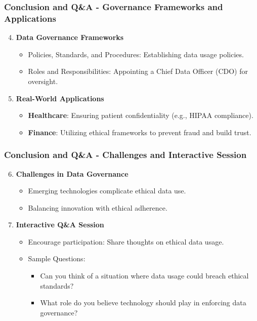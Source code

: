 \documentclass[aspectratio=169]{beamer}
\begin{document}
\begin{frame}[fragile]
    \frametitle{Conclusion and Q\&A - Governance Frameworks and Applications}
    \begin{enumerate}
        \setcounter{enumi}{3} %
        \item \textbf{Data Governance Frameworks}
            \begin{itemize}
                \item Policies, Standards, and Procedures: Establishing data usage policies.
                \item Roles and Responsibilities: Appointing a Chief Data Officer (CDO) for oversight.
            \end{itemize}
        
        \item \textbf{Real-World Applications}
            \begin{itemize}
                \item \textbf{Healthcare}: Ensuring patient confidentiality (e.g., HIPAA compliance).
                \item \textbf{Finance}: Utilizing ethical frameworks to prevent fraud and build trust.
            \end{itemize}
    \end{enumerate}
\end{frame}

\begin{frame}[fragile]
    \frametitle{Conclusion and Q\&A - Challenges and Interactive Session}
    \begin{enumerate}
        \setcounter{enumi}{5} %
        \item \textbf{Challenges in Data Governance}
            \begin{itemize}
                \item Emerging technologies complicate ethical data use.
                \item Balancing innovation with ethical adherence.
            \end{itemize}
        
        \item \textbf{Interactive Q\&A Session}
            \begin{itemize}
                \item Encourage participation: Share thoughts on ethical data usage.
                \item Sample Questions:
                    \begin{itemize}
                        \item Can you think of a situation where data usage could breach ethical standards?
                        \item What role do you believe technology should play in enforcing data governance?
                    \end{itemize}
            \end{itemize}
    \end{enumerate}
\end{frame}
\end{document}
